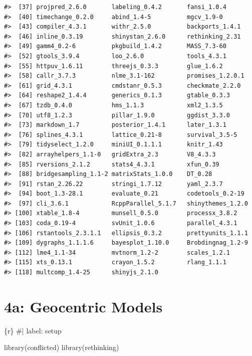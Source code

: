 \documentclass[
  letterpaper,
  DIV=11,
  numbers=noendperiod]{scrreprt}
\newenvironment{Shaded}{\begin{snugshade}}{\end{snugshade}}
\newcommand{\CommentTok}[1]{\textcolor[rgb]{0.37,0.37,0.37}{#1}}
\newcommand{\FunctionTok}[1]{\textcolor[rgb]{0.28,0.35,0.67}{#1}}
\newcommand{\InformationTok}[1]{\textcolor[rgb]{0.37,0.37,0.37}{#1}}
\newcommand{\NormalTok}[1]{\textcolor[rgb]{0.00,0.23,0.31}{#1}}
\begin{document}
\begin{verbatim}
#>  [37] projpred_2.6.0       labeling_0.4.2       fansi_1.0.4         
#>  [40] timechange_0.2.0     abind_1.4-5          mgcv_1.9-0          
#>  [43] compiler_4.3.1       withr_2.5.0          backports_1.4.1     
#>  [46] inline_0.3.19        shinystan_2.6.0      rethinking_2.31     
#>  [49] gamm4_0.2-6          pkgbuild_1.4.2       MASS_7.3-60         
#>  [52] gtools_3.9.4         loo_2.6.0            tools_4.3.1         
#>  [55] httpuv_1.6.11        threejs_0.3.3        glue_1.6.2          
#>  [58] callr_3.7.3          nlme_3.1-162         promises_1.2.0.1    
#>  [61] grid_4.3.1           cmdstanr_0.5.3       checkmate_2.2.0     
#>  [64] reshape2_1.4.4       generics_0.1.3       gtable_0.3.3        
#>  [67] tzdb_0.4.0           hms_1.1.3            xml2_1.3.5          
#>  [70] utf8_1.2.3           pillar_1.9.0         ggdist_3.3.0        
#>  [73] markdown_1.7         posterior_1.4.1      later_1.3.1         
#>  [76] splines_4.3.1        lattice_0.21-8       survival_3.5-5      
#>  [79] tidyselect_1.2.0     miniUI_0.1.1.1       knitr_1.43          
#>  [82] arrayhelpers_1.1-0   gridExtra_2.3        V8_4.3.3            
#>  [85] rversions_2.1.2      stats4_4.3.1         xfun_0.39           
#>  [88] bridgesampling_1.1-2 matrixStats_1.0.0    DT_0.28             
#>  [91] rstan_2.26.22        stringi_1.7.12       yaml_2.3.7          
#>  [94] boot_1.3-28.1        evaluate_0.21        codetools_0.2-19    
#>  [97] cli_3.6.1            RcppParallel_5.1.7   shinythemes_1.2.0   
#> [100] xtable_1.8-4         munsell_0.5.0        processx_3.8.2      
#> [103] coda_0.19-4          svUnit_1.0.6         parallel_4.3.1      
#> [106] rstantools_2.3.1.1   ellipsis_0.3.2       prettyunits_1.1.1   
#> [109] dygraphs_1.1.1.6     bayesplot_1.10.0     Brobdingnag_1.2-9   
#> [112] lme4_1.1-34          mvtnorm_1.2-2        scales_1.2.1        
#> [115] xts_0.13.1           crayon_1.5.2         rlang_1.1.1         
#> [118] multcomp_1.4-25      shinyjs_2.1.0
\end{verbatim}


\hypertarget{a-geocentric-models}{%
\chapter{4a: Geocentric Models}\label{a-geocentric-models}}

\begin{Shaded}
\begin{Highlighting}[]
\InformationTok{\textasciigrave{}\textasciigrave{}\textasciigrave{}\{r\}}
\CommentTok{\#| label: setup}

\FunctionTok{library}\NormalTok{(conflicted)}
\FunctionTok{library}\NormalTok{(rethinking)}
\InformationTok{\textasciigrave{}\textasciigrave{}\textasciigrave{}}
\end{Highlighting}
\end{Shaded}
\end{document}
